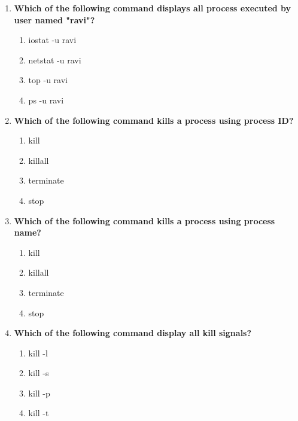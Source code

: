 \begin{flushleft}
\begin{enumerate}
		\item \textbf{Which of the following command displays all process executed by user named "ravi"?}
		\begin{enumerate}[label=(\alph*)]
			\item iostat -u ravi
			\item netstat -u ravi
			\item top -u ravi    
			\item ps -u ravi   %
		\end{enumerate}
		\bigskip
		\bigskip	
		
		\item \textbf{Which of the following command kills a process using process ID?}
		\begin{enumerate}[label=(\alph*)]
			\item kill  %
			\item killall
			\item terminate
			\item stop
		\end{enumerate}
		\bigskip
		\bigskip	

		\item \textbf{Which of the following command kills a process using process name?}
		\begin{enumerate}[label=(\alph*)]
			\item kill  
			\item killall  %
			\item terminate
			\item stop
		\end{enumerate}
		\bigskip
		\bigskip

		\item \textbf{Which of the following command display all kill signals?}
		\begin{enumerate}[label=(\alph*)]
			\item kill -l  %
			\item kill -s
			\item kill -p
			\item kill -t
		\end{enumerate}
		\bigskip
		\bigskip
		
	\end{enumerate}
	
	
\end{flushleft}

\newpage

